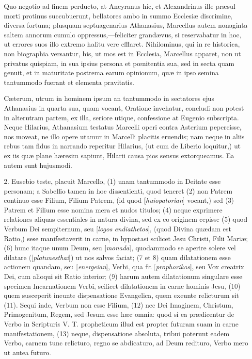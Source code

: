 Quo
negotio ad finem perducto, at Ancyranus hic, et Alexandrinus ille præsul
morti protinus succubuerunt, bellatores ambo in summo Ecclesiæ
discrimine, diversa fortuna; plusquam septuagenarius Athanasius,
Marcellus autem nonaginta saltem annorum cumulo oppressus,—feliciter
grandævus, si reservabatur in hoc, ut errores suos illo extremo
halitu vere efflaret. Nihilominus, qui in re historica, non
biographia versantur, his, ut mos est in Ecclesia, Marcellus apparet,
non ut privatus quispiam, in sua ipsius persona et pœnitentia sua,
sed in secta quam genuit, et in maturitate postrema earum opinionum,
quæ in ipso semina tantummodo fuerant et elementa pravitatis.

Cæterum,
utrum in hominem ipsum an tantummodo in sectatores ejus Athanasius in
quarta sua, quam vocant, Oratione invehatur, concludi non potest in
alterutram partem, ex illa, seriore utique, confessione at Eugenio
subscripta. Neque Hilarius, Athanasium testatus Marcelli operi contra
Asterium pepercisse, nos moveat, ne illo opere utamur in Marcelli
placitis eruendis; nam neque in aliis rebus tam fidus in narrando
reperitur Hilarius, (ut cum de Liberio loquitur,) ut ex iis quæ plane
hæresim sapiunt, Hilarii causa pios sensus extorqueamus. Ea autem
sunt hujusmodi.

2.
Eusebio teste, placuit Marcello, (1) unam tantummodo in Deitate esse
personam; a Sabellio tamen in hoc dissentienti, quod teneret (2) non
Patrem continuo esse Filium, Filium Patrem, (id quod [\emph{huiopatorian}]
vocant,) sed (3) Patrem et Filium esse nomina mera et nudos titulos;
(4) neque exprimere relationes aliquas essentiales in natura divina,
sed ex eo originem cepisse (5) quod Verbum Dei sempiternum, seu [\emph{logos
endiathetos}], (quod Divina quædam est Ratio,) sese manifestaverit
in carne, in hypostasi scilicet Jesu Christi, Filii Mariæ; (6) hunc
itaque unum Deum, seu [\emph{monada}], quodammodo se aperire solere
vel dilatare ([\emph{platunesthai}]) ut nos salvos faciat; (7 et 8)
quam dilatationem esse actionem quandam, seu [\emph{energeian}], Verbi,
qua fit [\emph{prophorikos}], seu Vox creatrix Dei, cum alioqui
sit Ratio interior; (9) harum autem dilatationum singulare esse
specimen Incarnationem Verbi, scilicet dilatationem in carne hominis
Jesu, (10) quem susceperit ineunte dispensatione Evangelica, quem
exeunte relicturum sit (11). Sequi inde, Verbum non esse Filium, (12)
nec Dei Imaginem, Christum, Primogenitum, Regem, sed Jesum esse hæc
omnia: quod si ea prædicentur de Verbo in Scripturis V. T. propheticum
illud est propter futuram suam in carne manifestationem, (13) neque,
dispensatione absoluta, tribui poterunt eadem Verbo, carnem tunc
relicturo, regno se abdicaturo, ad Deum redituro, Verbo mero ut antea
futuro.

